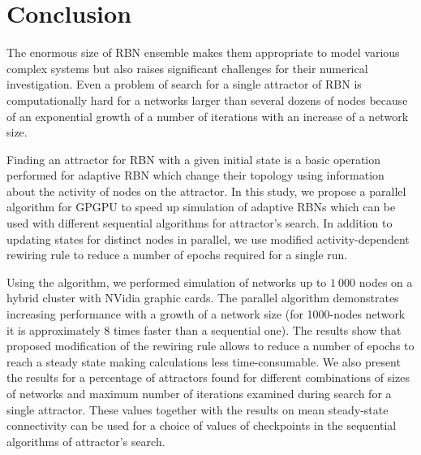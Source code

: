 \documentclass[procedia]{easychair}
\begin{document}
	\section{Conclusion}
	The enormous size of RBN ensemble makes them appropriate to model various complex systems but also raises significant challenges for their numerical investigation. Even a problem of search for a single attractor of RBN is computationally hard for a networks larger than several dozens of nodes because of an exponential growth of a number of iterations with an increase of a network size.
	
	Finding an attractor for RBN with a given initial state is a basic operation performed for adaptive RBN which change their topology using information about the activity of nodes on the attractor. In this study, we propose a parallel algorithm for GPGPU to speed up simulation of adaptive RBNs which can be used with different sequential algorithms for attractor's search. In addition to updating states for distinct nodes in parallel, we use modified activity-dependent rewiring rule to reduce a number of epochs required for a single run.
	
	Using the algorithm, we performed simulation of networks up to $1~000$ nodes on a hybrid cluster with NVidia graphic cards. The parallel algorithm demonstrates increasing performance with a growth of a network size (for 1000-nodes network it is approximately 8 times faster than a sequential one). The results show that proposed modification of the rewiring rule allows to reduce a number of epochs to reach a steady state making calculations less time-consumable. We also present the results for a percentage of attractors found for different combinations of sizes of networks and maximum number of iterations examined during search for a single attractor. These values together with the results on mean steady-state connectivity can be used for a choice of values of checkpoints in the sequential algorithms of attractor's search.   
	
	\label{sect:conclusion}
	
	\label{sect:bib}
	
	
\end{document}
